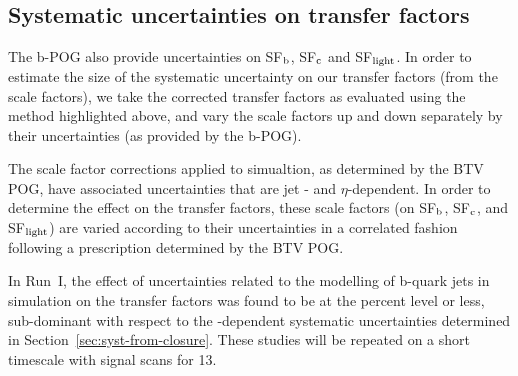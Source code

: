 \subsection{Systematic uncertainties on transfer factors\label{sec:btag-syst}}

The b-POG also provide uncertainties on SF$_{\rm b}$, SF$_{\rm c}$ and
SF$_{\rm light}$. In order to estimate the size of the systematic
uncertainty on our transfer factors (from the scale factors), we
take the corrected transfer factors as evaluated using the method
highlighted above, and vary the scale factors up and down separately
by their uncertainties (as provided by the b-POG).

The scale factor corrections applied to simualtion, as determined by
the BTV POG, have associated uncertainties that are jet \Pt- and
$\eta$-dependent. In order to determine the effect on the transfer
factors, these scale factors (on SF$_{\rm b}$, SF$_{\rm c}$, and SF$_{\rm light}$)
are varied according to their uncertainties in a correlated fashion
following a prescription determined by the BTV POG. 

In Run~I, the effect of uncertainties related to the modelling of
b-quark jets in simulation on the transfer factors was found to be at
the percent level or less, \ie sub-dominant with respect to the
\scalht-dependent systematic uncertainties determined in
Section~\ref{sec:syst-from-closure}. These studies will be repeated on
a short timescale with signal scans for 13\TeV.


